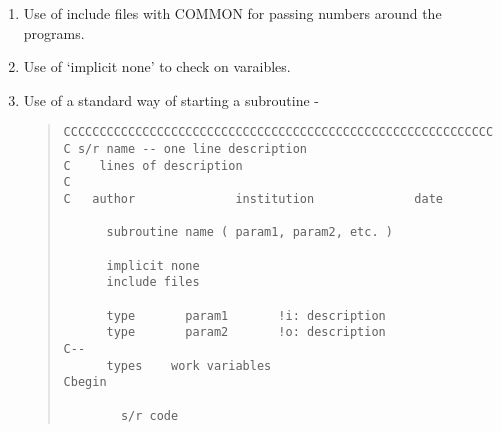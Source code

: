\begin{enumerate}

\item Use of include files with COMMON for passing numbers around
      the programs.  \item Use of `implicit none' to check on
varaibles.  \item Use of a standard way of starting a subroutine -

\begin{quote} \begin{tabbing}
\verb#CCCCCCCCCCCCCCCCCCCCCCCCCCCCCCCCCCCCCCCCCCCCCCCCCCCCCCCCCCCC # \\
\verb#C s/r name -- one line description                           # \\
\verb#C    lines of description                                    # \\
\verb#C                                                            # \\
\verb#C   author              institution              date        # \\
\verb#                                                             # \\
\verb#      subroutine name ( param1, param2, etc. )               # \\
\verb#                                                             # \\
\verb#      implicit none                                          # \\
\verb#      include files                                          # \\
\verb#                                                             # \\
\verb#      type       param1       !i: description                # \\
\verb#      type       param2       !o: description                # \\
\verb#C--                                                          # \\
\verb#      types    work variables                                # \\
\verb#Cbegin                                                       # \\
\verb#                                                             # \\
\verb#        s/r code                                             # \\
\end{tabbing} \end{quote}


\end{enumerate}
